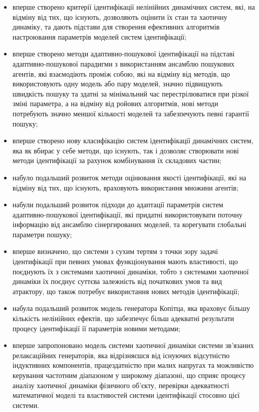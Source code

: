 \documentclass[a4paper,12pt]{atuaref}
\begin{document}
\begin{itemize}

  \item
  вперше
  створено критерії ідентифікації нелінійних динамічних систем,
  які, на відміну від тих, що існують, дозволяють оцінити їх стан та
  хаотичну динаміку, та дають підстави для створення ефективних алгоритмів
  настроювання параметрів моделей систем ідентифікації;

  \item
  вперше
  створено методи адаптивно-пошукової ідентифікації на підставі
  адаптивно-пошукової парадигми з використанням ансамблю пошукових агентів,
  які взаємодіють проміж собою, які на відміну від методів, що використовують
  одну модель або пару моделей, значно підвищують швидкість пошуку та
  здатні за мінімальний час перестрілюватися при різкої зміні параметра, а на
  відміну від ройових алгоритмів, нові методи потребують значно меншої
  кількості моделей та забезпечують певні гарантії пошуку;

  \item
  вперше
  створено нову класифікацію систем ідентифікації динамічних систем,
  яка як вбирає у себе методи, що існують, так і дозволяє
  створювати нові методи ідентифікації за рахунок
  комбінування їх складових частин;

  \item
  набуло подальший розвиток
  методи оцінювання якості ідентифікації,
  які на відміну від тих, що існують,
  враховують використання множини агентів;


  \item
  набули подальший розвиток
  підходи до адаптації параметрів систем
  адаптивно-пошукової ідентифікації, які придатні використовувати поточну
  інформацію від ансамблю сінергированих моделей, та корегувати глобальні
  параметри пошуку;

  \item
   вперше
   визначено, що системи з сухим тертям з точки зору задачі ідентифікації
   при певних  умовах функціонування
   мають властивості, що поєднують їх з системами хаотичної динаміки, тобто з
   системами хаотичної динаміки їх поєднує суттєва залежність від початкових
   умов та вид атрактору, що також потребує використання нових методів ідентифікації;

  \item
    набула подальший розвиток
    модель генератора Копітца, яка враховує
    більшу кількість нелінійних ефектів,
    що забезпечує більш адекватні результати процесу
    ідентифікації її параметрів новими методами;

  \item
   вперше
   запропоновано модель системи хаотичної динаміки системи зв'язаних релаксаційних генераторів,
   яка відрізняєшся від існуючих відсутністю індуктивних компонентів,
   працездатністю при малих напругах та можливістю
   керування частотним діапазоном у широкому діапазоні,
   що сприяє процесу аналізу хаотичної динаміки
   фізичного об'єкту, перевірки адекватності математичної моделі
   та властивостей системи ідентифікації стосовно цієї системи.


\end{itemize}
\end{document}
